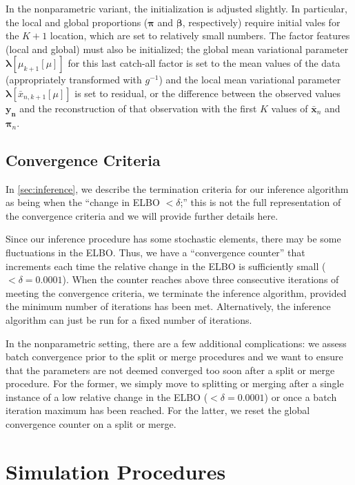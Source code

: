 \documentclass[twoside,11pt]{article}
\begin{document}
In the nonparametric variant, the initialization is adjusted slightly.  In particular, the local and global proportions ($\boldsymbol{\pi}$ and $\boldsymbol{\beta}$, respectively) require initial vales for the $K+1$ location, which are set to relatively small numbers.  The factor features (local and global) must also be initialized; the global mean variational parameter $\boldsymbol{\lambda}[\mu_{k+1}[\mu]]$ for this last catch-all factor is set to the mean values of the data (appropriately transformed with $g^{-1}$) and the local mean variational parameter  $\boldsymbol{\lambda}[\bar{x}_{n,k+1}[\mu]]$ is set to residual, or the difference between the observed values $\boldsymbol{y_n}$ and the reconstruction of that observation with the first $K$ values of $\boldsymbol{\bar{x}}_n$ and $\boldsymbol{\pi}_n$.

\subsection{Convergence Criteria}
\label{app:convergence}

In \cref{sec:inference}, we describe the termination criteria for our inference algorithm as being when the ``change in ELBO $< \delta$;'' this is not the full representation of the convergence criteria and we will provide further details here.

Since our inference procedure has some stochastic elements, there may be some fluctuations in the ELBO.  Thus, we have a ``convergence counter'' that increments each time the relative change in the ELBO is sufficiently small ($< \delta=0.0001$).  When the counter reaches above three consecutive iterations of meeting the convergence criteria, we terminate the inference algorithm, provided the minimum number of iterations has been met.  Alternatively, the inference algorithm can just be run for a fixed number of iterations.

In the nonparametric setting, there are a few additional complications: we assess batch convergence prior to the split or merge procedures and we want to ensure that the parameters are not deemed converged too soon after a split or merge procedure.  For the former, we simply move to splitting or merging after a single instance of a low relative change in the ELBO ($< \delta=0.0001$) or once a batch iteration maximum has been reached.  For the latter, we reset the global convergence counter on a split or merge.

\section{Simulation Procedures}
\label{sec:app_sim}
\end{document}
